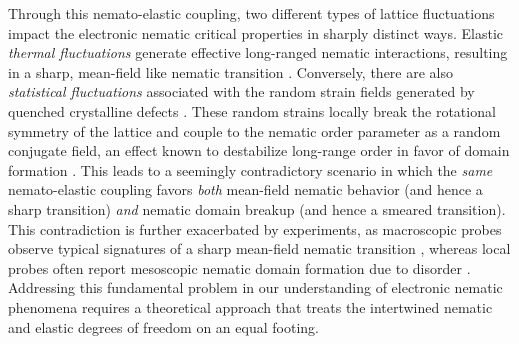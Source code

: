 \documentclass[aps,prb, twocolumn, superscriptaddress, amsmath, amsfonts, amssymb, amsthm]{revtex4-2}
\begin{document}
Through this nemato-elastic coupling, two different types of lattice fluctuations impact the electronic nematic critical properties in sharply distinct ways. Elastic \textit{thermal fluctuations} generate effective long-ranged nematic interactions, resulting in a sharp, mean-field like nematic transition \cite{Karahasanovic16, Paul17, Fernandes2020, sanchezQuantitativeRelationshipStructural2022, Hecker2022, stewardElasticQuantumCriticality2025}. Conversely, there are also \textit{statistical fluctuations} associated with the random strain fields generated by quenched crystalline defects \citep{tanatarDirectImagingStructural2009, jescheCouplingStructuralMagnetic2010, Ran2011, Forrest2016, Ren2021, bohmerNematicityNematicFluctuations2022, curroNematicityGlassyBehavior2022}. These random strains locally break the rotational symmetry of the lattice and couple to the nematic order parameter as a random conjugate field, an effect known to destabilize long-range order in favor of domain formation \cite{schneiderRandomfieldInstabilityFerromagnetic1977, Imry_Ma, Binder1983, nattermannInstabilitiesIsingSystems1983, grinsteinSurfaceTensionRoughening1983, Carlson2006, Dahmen2010, carlsonUsingDisorderDetect2011, Phillabaum2012, vojtaPhasesPhaseTransitions2013, nieQuenchedDisorderVestigial2014, vojtaDisorderQuantumManyBody2019, mirandaPhaseDiagramFrustrated2021, yeStripeOrderImpurities2022, RMF01_RFBM, RMF06_Potts_nematic_strain,yangCoarseningDynamicsIsingnematic2025}.
This leads to a seemingly contradictory scenario in which the \textit{same} nemato-elastic coupling favors \textit{both} mean-field nematic behavior (and hence a sharp transition) \textit{and} nematic domain breakup (and hence a smeared transition). This contradiction is further exacerbated by experiments, as macroscopic probes observe typical signatures of a sharp mean-field nematic transition \citep{Ran2011, Forrest2016, Chu2010_nem, Chu12_nem, bohmerNematicityNematicFluctuations2022, Kuo16_nem, Hwangbo2024_nem}, whereas local probes often report mesoscopic nematic domain formation due to disorder \citep{tanatarDirectImagingStructural2009, Ran2011, Forrest2016, Ren2021, Dioguardi2015, Dioguardi2016, Hwangbo2024_nem, maMicrostructureTetragonaltoorthorhombicPhase2009, Rosenthal2014, RMF08_Potts_nematic_strain}. Addressing this fundamental problem in our understanding of electronic nematic phenomena requires a theoretical approach that treats the intertwined nematic and elastic degrees of freedom on an equal footing.
\end{document}
